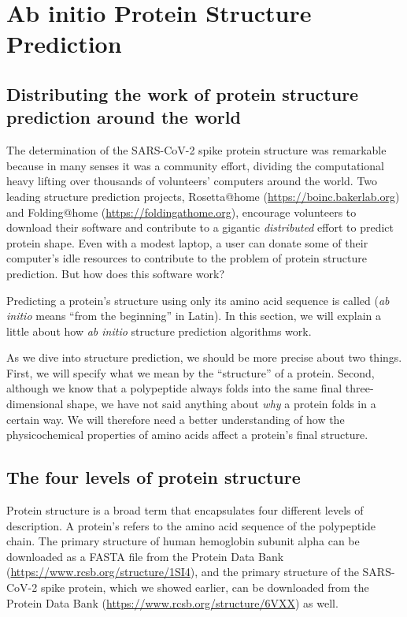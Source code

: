 \FloatBarrier
{}

\section{Ab initio Protein Structure Prediction}
\label{sec:ab_initio}
\subsection{Distributing the work of protein structure prediction around the world}

The determination of the SARS-CoV-2 spike protein structure was remarkable because in many senses it was a community effort, dividing the computational heavy lifting over thousands of volunteers' computers around the world. Two leading structure prediction projects, Rosetta@home (\url{https://boinc.bakerlab.org}) and Folding@home (\url{https://foldingathome.org}), encourage volunteers to download their software and contribute to a gigantic \textit{distributed} effort to predict protein shape. Even with a modest laptop, a user can donate some of their computer's idle resources to contribute to the problem of protein structure prediction. But how does this software work?

Predicting a protein’s structure using only its amino acid sequence is called  (\textit{ab initio} means “from the beginning” in Latin). In this section, we will explain a little about how \textit{ab initio} structure prediction algorithms work.

As we dive into structure prediction, we should be more precise about two things. First, we will specify what we mean by the ``structure'' of a protein. Second, although we know that a polypeptide always folds into the same final three-dimensional shape, we have not said anything about \textit{why} a protein folds in a certain way. We will therefore need a better understanding of how the physicochemical properties of amino acids affect a protein's final structure.

\FloatBarrier
{}
\subsection{The four levels of protein structure}

Protein structure is a broad term that encapsulates four different levels of description. A protein's  refers to the amino acid sequence of the polypeptide chain. The primary structure of human hemoglobin subunit alpha can be downloaded as a FASTA file from the Protein Data Bank (\url{https://www.rcsb.org/structure/1SI4}), and the primary structure of the SARS-CoV-2 spike protein, which we showed earlier, can be downloaded from the Protein Data Bank (\url{https://www.rcsb.org/structure/6VXX}) as well.

